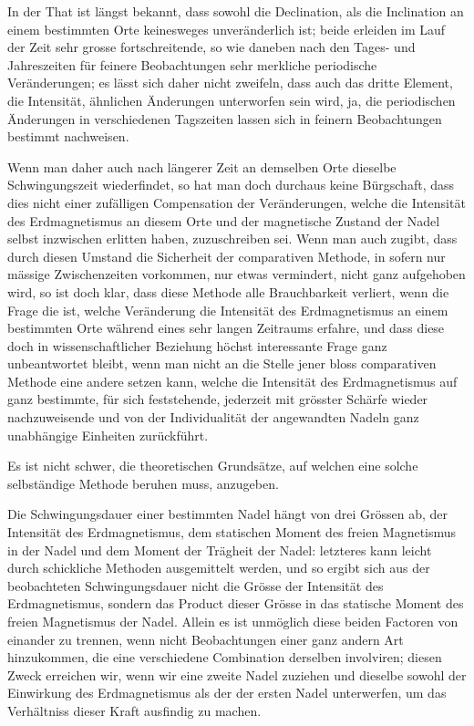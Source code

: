\documentclass[12pt,a4paper]{article}
\begin{document}
In der That ist längst bekannt, dass sowohl die Declination, als die Inclination an einem bestimmten Orte keinesweges unveränderlich ist; beide erleiden im Lauf der Zeit sehr grosse fortschreitende, so wie daneben nach den Tages- und Jahreszeiten für feinere Beobachtungen sehr merkliche periodische Veränderungen; es lässt sich daher nicht zweifeln, dass auch das dritte Element, die Intensität, ähnlichen Änderungen unterworfen sein wird, ja, die periodischen Änderungen in verschiedenen Tagszeiten lassen sich in feinern Beobachtungen bestimmt nachweisen.

Wenn man daher auch nach längerer Zeit an demselben Orte dieselbe Schwingungszeit wiederfindet, so hat man doch durchaus keine Bürgschaft, dass dies nicht einer zufälligen Compensation der Veränderungen, welche die Intensität des Erdmagnetismus an diesem Orte und der magnetische Zustand der Nadel selbst inzwischen erlitten haben, zuzuschreiben sei. Wenn man auch zugibt, dass durch diesen Umstand die Sicherheit der comparativen Methode, in sofern nur mässige Zwischenzeiten vorkommen, nur etwas vermindert, nicht ganz aufgehoben wird, so ist doch klar, dass diese Methode alle Brauchbarkeit verliert, wenn die Frage die ist, welche Veränderung die Intensität des Erdmagnetismus an einem bestimmten Orte während eines sehr langen Zeitraums erfahre, und dass diese doch in wissenschaftlicher Beziehung höchst interessante Frage ganz unbeantwortet bleibt, wenn man nicht an die Stelle jener bloss comparativen Methode eine andere setzen kann, welche die Intensität des Erdmagnetismus auf ganz bestimmte, für sich feststehende, jederzeit mit grösster Schärfe wieder nachzuweisende und von der Individualität der angewandten Nadeln ganz unabhängige Einheiten zurückführt.

Es ist nicht schwer, die theoretischen Grundsätze, auf welchen eine solche selbständige Methode beruhen muss, anzugeben.

Die Schwingungsdauer einer bestimmten Nadel hängt von drei Grössen ab, der Intensität des Erdmagnetismus, dem statischen Moment des freien Magnetismus in der Nadel und dem Moment der Trägheit der Nadel: letzteres kann leicht durch schickliche Methoden ausgemittelt werden, und so ergibt sich aus der beobachteten Schwingungsdauer nicht die Grösse der Intensität des Erdmagnetismus, sondern das Product dieser Grösse in das statische Moment des freien Magnetismus der Nadel. Allein es ist unmöglich diese beiden Factoren von einander zu trennen, wenn nicht Beobachtungen einer ganz andern Art hinzukommen, die eine verschiedene Combination derselben involviren; diesen Zweck erreichen wir, wenn wir eine zweite Nadel zuziehen und dieselbe sowohl der Einwirkung des Erdmagnetismus als der der ersten Nadel unterwerfen, um das Verhältniss dieser Kraft ausfindig zu machen.
\end{document}
